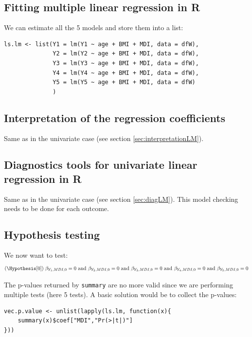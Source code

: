 \documentclass{article}
\newcommand\Rlogo{\textbf{\textsf{R}}}
\begin{document}
\subsection{Fitting multiple linear regression in \Rlogo{}}
\label{sec:orgd3260cb}

We can estimate all the 5 models and store them into a list:
\lstset{language=r,label= ,caption= ,captionpos=b,numbers=none}
\begin{lstlisting}
ls.lm <- list(Y1 = lm(Y1 ~ age + BMI + MDI, data = dfW),
			  Y2 = lm(Y2 ~ age + BMI + MDI, data = dfW),
			  Y3 = lm(Y3 ~ age + BMI + MDI, data = dfW),
			  Y4 = lm(Y4 ~ age + BMI + MDI, data = dfW),
			  Y5 = lm(Y5 ~ age + BMI + MDI, data = dfW)
			  )
\end{lstlisting}

\subsection{Interpretation of the regression coefficients}
\label{sec:orga3cb513}

Same as in the univariate case (see section \ref{sec:interpretationLM}).

\subsection{Diagnostics tools for univariate linear regression in \Rlogo{}}
\label{sec:org7cc3cb1}

Same as in the univariate case (see section \ref{sec:diagLM}). This model
checking needs to be done for each outcome.

\subsection{Hypothesis testing}
\label{sec:org038e05b}

We now want to test:
\begin{align*}
(\Hypothesis[0]) \; \beta_{Y_1, MDI, 0} = 0
 \text{ and } \beta_{Y_2, MDI, 0} = 0
 \text{ and } \beta_{Y_3, MDI, 0} = 0
 \text{ and } \beta_{Y_4, MDI, 0} = 0
 \text{ and } \beta_{Y_5, MDI, 0} = 0
\end{align*}

The p-values returned by \texttt{summary} are no more valid since we are
performing multiple tests (here 5 tests). A basic solution would be to
collect the p-values:
\lstset{language=r,label= ,caption= ,captionpos=b,numbers=none}
\begin{lstlisting}
vec.p.value <- unlist(lapply(ls.lm, function(x){
	summary(x)$coef["MDI","Pr(>|t|)"]
}))
\end{lstlisting}
\end{document}
